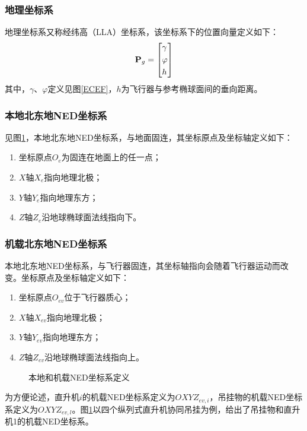 \subsubsection{地理坐标系}
地理坐标系又称经纬高（LLA）坐标系，该坐标系下的位置向量定义如下：
\begin{equation}
  {\mathbf{P}}_g = \left[ \begin{gathered}
    \gamma  \hfill \\
    \varphi  \hfill \\
    h \hfill \\ 
  \end{gathered}  \right]
\end{equation}
其中，$\gamma$、$\varphi$定义见图\ref{ECEF}，$h$为飞行器与参考椭球面间的垂向距离。

\subsubsection{本地北东地NED坐标系}
见图\ref{NED}，本地北东地NED坐标系，与地面固连，其坐标原点及坐标轴定义如下：
\begin{enumerate}
  \item 坐标原点$O_e$为固连在地面上的任一点；
  \item $X$轴$X_{e}$指向地理北极；
  \item $Y$轴$Y_{e}$指向地理东方；
  \item $Z$轴$Z_{e}$沿地球椭球面法线指向下。
\end{enumerate}

\subsubsection{机载北东地NED坐标系}
本地北东地NED坐标系，与飞行器固连，其坐标轴指向会随着飞行器运动而改变。坐标原点及坐标轴定义如下：
\begin{enumerate}
  \item 坐标原点$O_{ev}$位于飞行器质心；
  \item $X$轴$X_{ev}$指向地理北极；
  \item $Y$轴$Y_{ev}$指向地理东方；
  \item $Z$轴$Z_{ev}$沿地球椭球面法线指向上。
\end{enumerate}

\begin{figure}[htb!]
  
  \caption{本地和机载NED坐标系定义\label{NED}}
\end{figure}

为方便论述，直升机$i$的机载NED坐标系定义为$OXYZ_{ev,i}$，吊挂物的机载NED坐标系定义为$OXYZ_{ev,l}$。图\ref{NED}以四个纵列式直升机协同吊挂为例，给出了吊挂物和直升机1的机载NED坐标系。

